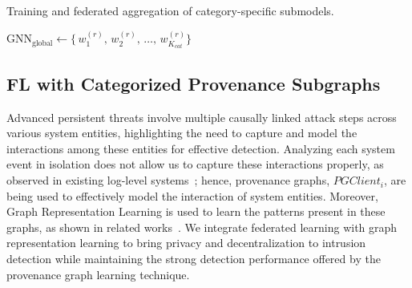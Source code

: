 \begin{algorithm}[!t]
  \scriptsize
  \DontPrintSemicolon
  \caption{Training and federated aggregation of category-specific submodels.}
  \label{alg:training_submodel}


  \BlankLine

  \BlankLine

  \BlankLine
  \Return \(\displaystyle \text{GNN}_{\text{global}} \leftarrow \{\,w_1^{(r)},\, w_2^{(r)},\, \ldots,\, w_{K_{cat}}^{(r)}\}\)
  \label{alg:submodel}
\end{algorithm}

\subsection{FL with Categorized Provenance Subgraphs}
\label{sys:fpgl}

Advanced persistent threats involve multiple causally linked attack steps across various system entities, highlighting the need to capture and model the interactions among these entities for effective detection. Analyzing each system event in isolation does not allow us to capture these interactions properly, as observed in existing log-level systems~\cite{deeplog2017,liu2019log2vec,xia2019loggan}; hence, provenance graphs, \( PGClient_{i} \), are being used to effectively model the interaction of system entities. Moreover, Graph Representation Learning is used to learn the patterns present in these graphs, as shown in related works~\cite{flash2024,cheng2023kairos,jia2023magic}. We integrate federated learning with graph representation learning to bring privacy and decentralization to intrusion detection while maintaining the strong detection performance offered by the provenance graph learning technique.

